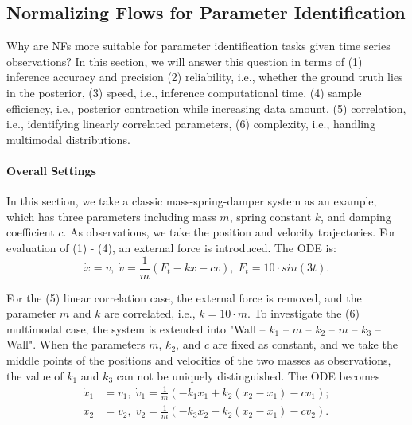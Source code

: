 \subsection{Normalizing Flows for Parameter Identification}
Why are \acp{NF} more suitable for parameter identification tasks given time series observations? In this section, we will answer this question in terms of (1) inference accuracy and precision (2) reliability, i.e., whether the ground truth lies in the posterior, (3) speed, i.e., inference computational time, (4) sample efficiency, i.e., posterior contraction while increasing data amount, (5) correlation, i.e., identifying linearly correlated parameters, (6) complexity, i.e., handling multimodal distributions.

\paragraph{Overall Settings}
In this section, we take a classic mass-spring-damper system as an example, which has three parameters including mass $m$, spring constant $k$, and damping coefficient $c$. As observations, we take the position and velocity trajectories. For evaluation of (1) - (4), an external force is introduced. The \ac{ODE} is:
\begin{equation}
    \dot x = v,\; \dot v = \frac{1}{m}(F_t-kx-cv),\; F_t = 10\cdot sin(3t).
\end{equation}

For the (5) linear correlation case, the external force is removed, and the parameter $m$ and $k$ are correlated, i.e., $k=10\cdot m$. To investigate the (6) multimodal case, the system is extended into "Wall -- $k_1$ -- $m$ -- $k_2$ -- $m$ -- $k_3$ -- Wall". When the parameters $m$, $k_2$, and $c$ are fixed as constant, and we take the middle points of the positions and velocities of the two masses as observations, the value of $k_1$ and $k_3$ can not be uniquely distinguished. The \ac{ODE} becomes
\begin{align}
    \dot x_1 &= v_1,\;\dot v_1=\frac{1}{m}(-k_1x_1+k_2(x_2-x_1)-cv_1);\\
    \dot x_2 &= v_2,\;\dot v_2=\frac{1}{m}(-k_3x_2-k_2(x_2-x_1)-cv_2).
\end{align}

